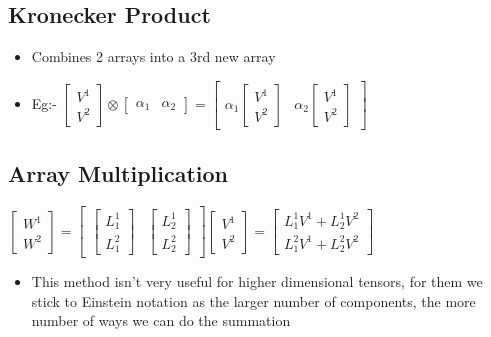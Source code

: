 \subsection{Kronecker Product}
\begin{itemize}
\item Combines 2 arrays into a 3rd new array
\item Eg:-  $\begin{bmatrix}V^{1} \\
V^{2} \end{bmatrix} \otimes \begin{bmatrix}\alpha_{1} &
\alpha_{2} \end{bmatrix} = \begin{bmatrix}
\alpha_{1} \begin{bmatrix}V^{1} \\
V^{2} \end{bmatrix} & \alpha_{2} \begin{bmatrix}V^{1} \\
V^{2} \end{bmatrix}
\end{bmatrix}$
\end{itemize}
\subsection{Array Multiplication}
$\begin{bmatrix}
W^{1}\\
W^{2}
\end{bmatrix} = \begin{bmatrix}
\begin{bmatrix}
L^{1}_{1} \\
L^{2}_{1}
\end{bmatrix} & \begin{bmatrix}
L^{1}_{2} \\
L^{2}_{2}
\end{bmatrix}
\end{bmatrix} \begin{bmatrix}
V^{1}\\
V^{2}
\end{bmatrix} = \begin{bmatrix}
L^{1}_{1} V^{1} + L^{1}_{2} V^{2}\\
L^{2}_{1} V^{1} + L^{2}_{2} V^{2}
\end{bmatrix}$
\begin{itemize}
\item This method isn't very useful for higher dimensional tensors, for them we stick to Einstein notation as the larger number of components, the more number of ways we can do the summation
\end{itemize}
